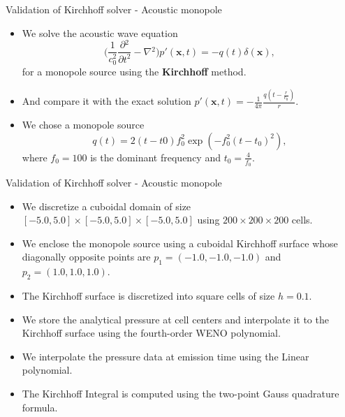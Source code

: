 \documentclass[10pt, aspectratio=169]{beamer}
\begin{document}
\begin{frame}{Validation of Kirchhoff solver - Acoustic monopole}
	\begin{itemize}
		\item We solve the acoustic wave equation
		\begin{equation}
			\Bigg( \frac{1}{c_{0}^2}\frac{\partial{}^{2}}{\partial{t}^{2}}- \nabla{}^{2} \Bigg) p'(\mathbf{x}, t)  = -q(t)\delta(\mathbf{x}), 
		\end{equation}
		for a monopole source using the \textbf{Kirchhoff} method.
		\item And compare it with the exact solution $p'(\mathbf{x}, t) = -\frac{1}{4\pi} \frac{  q(t - \frac{r}{c_{0}}) }{r}$.
		\item We chose a monopole source
		\begin{equation}
			q(t) = 2(t - t0)f_{0}^{2}\exp( -f_{0}^2(t - t_{0})^{2}), 
		\end{equation}
		where $f_{0} = 100$ is the dominant frequency and $t_{0} = \frac{4}{f_{0}}$.
	\end{itemize}
\end{frame}

\begin{frame}{Validation of Kirchhoff solver - Acoustic monopole}
	\begin{itemize}
		\item We discretize a cuboidal domain of size $[-5.0,5.0]\times[-5.0,5.0]\times[-5.0,5.0]$ using $200 \times 200 \times 200$ cells.
		\item We enclose the monopole source using a cuboidal Kirchhoff surface whose diagonally opposite points are $p_{1} = (-1.0, -1.0, -1.0)$
		and $p_{2} = (1.0, 1.0, 1.0)$.
		\item The Kirchhoff surface is discretized into square cells of size $h = 0.1$.
		\item We store the analytical pressure at cell centers and interpolate it to the Kirchhoff surface using the fourth-order WENO polynomial.
		\item We interpolate the pressure data at emission time using the Linear polynomial.
		\item The Kirchhoff Integral is computed using the two-point Gauss quadrature formula.
	\end{itemize}
\end{frame}
\end{document}
